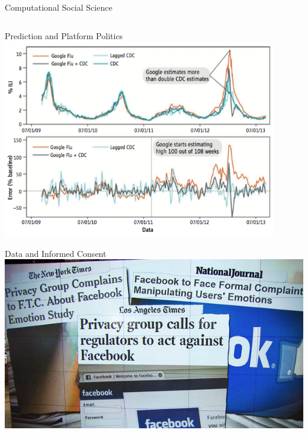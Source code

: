 \documentclass{beamer}
\begin{document}
\begin{frame}{Computational Social Science}
\begin{columns}
\begin{column}{0.5\textwidth}
    \end{column}
  \end{columns}
\end{frame}

\begin{frame}{Prediction and Platform Politics}
  \includegraphics[width=0.9\textwidth]{img/lazer_etal_2014-f1.png}
\end{frame}

\begin{frame}{Data and Informed Consent}
  \includegraphics[width=\textwidth]{img/fb-emotion-study.jpg}
\end{frame}
\end{document}
